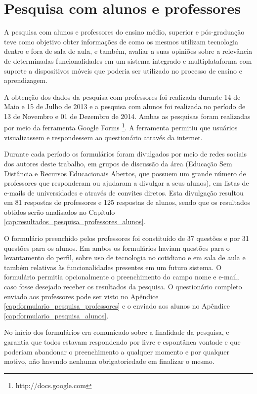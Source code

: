 \section{Pesquisa com alunos e professores}
\label{sec:metodologia_professores}

A pesquisa com alunos e professores do ensino médio, superior e pós-graduação teve como objetivo obter informações de como os mesmos utilizam tecnologia dentro e fora de sala de aula, e também, avaliar a suas opiniões sobre a relevância de determinadas funcionalidades em um sistema integrado e multiplataforma com suporte a dispositivos móveis que poderia ser utilizado no processo de ensino e aprendizagem.

A obtenção dos dados da pesquisa com professores foi realizada durante 14 de Maio e 15 de Julho de 2013 e a pesquisa com alunos foi realizada no período de 13 de Novembro e 01 de Dezembro de 2014. Ambas as pesquisas foram realizadas por meio da ferramenta Google Forms \footnote{http://docs.google.com}. A ferramenta permitiu que usuários visualizassem e respondessem ao questionário através da internet. 

Durante cada período os formulários foram divulgados por meio de redes sociais dos autores deste trabalho, em grupos de discussão da área (Educação Sem Distância e Recursos Educacionais Abertos, que possuem um grande número de professores que responderam ou ajudaram a divulgar a seus alunos), em listas de e-mails de universidades e através de convites diretos. Esta divulgação resultou em 81 respostas de professores e 125 respostas de alunos, sendo que os resultados obtidos serão analisados no Capítulo \ref{cap:resultados_pesquisa_professores_alunos}.

O formulário preenchido pelos professores foi constituído de 37 questões e por 31 questões para os alunos. Em ambos os formulários haviam questões para o levantamento do perfil, sobre uso de tecnologia no cotidiano e em sala de aula e também relativas às funcionalidades presentes em um futuro sistema. O formulário permitia opcionalmente o preenchimento do campo nome e e-mail, caso fosse desejado receber os resultados da pesquisa. O questionário completo enviado aos professores pode ser visto no Apêndice \ref{cap:formulario_pesquisa_professores} e o enviado aos alunos no Apêndice \ref{cap:formulario_pesquisa_alunos}.

No início dos formulários era comunicado sobre a finalidade da pesquisa, e  garantia que todos estavam respondendo por livre e espontânea vontade e que poderiam abandonar o preenchimento a qualquer momento e por qualquer motivo, não havendo nenhuma obrigatoriedade em finalizar o mesmo.

